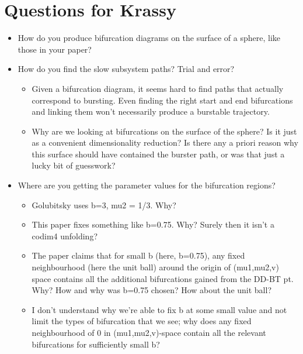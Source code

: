 \documentclass[11pt]{article}
\author{mark}
\date{\today}
\title{}
\begin{document}
\tableofcontents

\newpage
\section{Questions for Krassy}
\label{sec:org0759dda}
\begin{itemize}
\item How do you produce bifurcation diagrams on the surface of a sphere, like those in your paper?

\item How do you find the slow subsystem paths? Trial and error?
\begin{itemize}
\item Given a bifurcation diagram, it seems hard to find paths that actually correspond to bursting. Even finding the right start and end bifurcations and linking them won't necessarily produce a burstable trajectory.
\item Why are we looking at bifurcations on the surface of the sphere? Is it just as a convenient dimensionality reduction? Is there any a priori reason why this surface should have contained the burster path, or was that just a lucky bit of guesswork?
\end{itemize}

\item Where are you getting the parameter values for the bifurcation regions?
\begin{itemize}
\item Golubitsky uses b=3, mu2 = 1/3. Why?
\item This paper fixes something like b=0.75. Why? Surely then it isn't a codim4 unfolding?
\item The paper claims that for small b (here, b=0.75), any fixed neighbourhood (here the unit ball) around the origin of (mu1,mu2,v) space contains all the additional bifurcations gained from the DD-BT pt. Why? How and why was b=0.75 chosen? How about the unit ball?
\item I don't understand why we're able to fix b at some small value and not limit the types of bifurcation that we see; why does any fixed neighbourhood of 0 in (mu1,mu2,v)-space contain all the relevant bifurcations for sufficiently small b?
\end{itemize}


\end{itemize}
\end{document}
